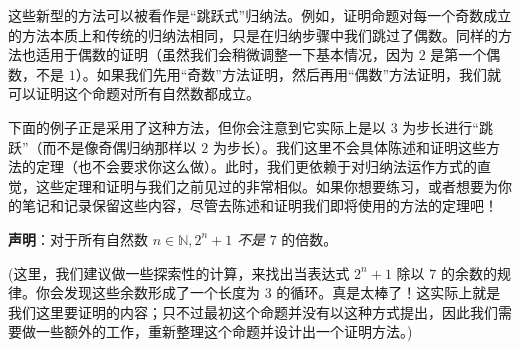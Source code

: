 这些新型的方法可以被看作是``跳跃式''归纳法。例如，证明命题对每一个奇数成立的方法本质上和传统的归纳法相同，只是在归纳步骤中我们跳过了偶数。同样的方法也适用于偶数的证明（虽然我们会稍微调整一下基本情况，因为 $2$ 是第一个偶数，不是 $1$）。如果我们先用``奇数''方法证明，然后再用``偶数''方法证明，我们就可以证明这个命题对所有自然数都成立。

下面的例子正是采用了这种方法，但你会注意到它实际上是以 $3$ 为步长进行``跳跃''（而不是像奇偶归纳那样以 $2$ 为步长）。我们这里不会具体陈述和证明这些方法的定理（也不会要求你这么做）。此时，我们更依赖于对归纳法运作方式的直觉，这些定理和证明与我们之前见过的非常相似。如果你想要练习，或者想要为你的笔记和记录保留这些内容，尽管去陈述和证明我们即将使用的方法的定理吧！\\

\begin{example}
    
    \textbf{声明}：对于所有自然数 $n \in \mathbb{N}, 2^n+1$ \emph{不是} $7$ 的倍数。
\end{example}

(这里，我们建议做一些探索性的计算，来找出当表达式 $2^n + 1$ 除以 $7$ 的余数的规律。你会发现这些余数形成了一个长度为 $3$ 的循环。真是太棒了！这实际上就是我们这里要证明的内容；只不过最初这个命题并没有以这种方式提出，因此我们需要做一些额外的工作，重新整理这个命题并设计出一个证明方法。)

